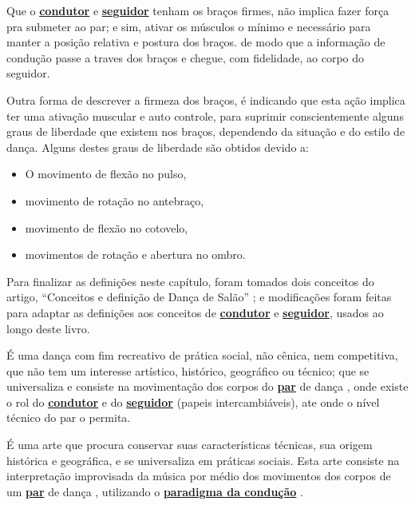 \begin{definition}
\label{def:brazosfirmes} 
Que o \hyperref[def:Condutor]{\textbf{condutor}} e \hyperref[def:Seguidor]{\textbf{seguidor}}
tenham os braços firmes, não implica fazer força pra submeter ao par;
e sim, ativar os músculos o mínimo e necessário para manter a posição relativa e postura dos braços.
de modo que a informação de condução passe a traves dos braços e chegue, com fidelidade, ao corpo do seguidor.

Outra forma de descrever a firmeza dos braços, 
é indicando que esta ação implica ter uma ativação muscular e auto controle, 
para suprimir conscientemente alguns graus de liberdade que existem nos braços, 
dependendo da situação e do estilo de dança.
Alguns destes graus de liberdade são obtidos devido a:
\begin{itemize}
\item O movimento de flexão no pulso,
\item movimento de rotação no antebraço,
\item movimento de flexão no cotovelo,
\item movimentos de rotação e abertura no ombro.
\end{itemize}
\end{definition}



Para finalizar as definições neste capítulo, foram tomados dois conceitos do artigo,
``Conceitos e definição de Dança de Salão'' \cite{Zamoner2012};
e modificações foram feitas para adaptar as definições aos conceitos de \hyperref[def:Condutor]{\textbf{condutor}} e \hyperref[def:Seguidor]{\textbf{seguidor}}, usados ao longo deste livro.

\begin{definition}
\label{def:DancaSocial} 
É uma dança com fim recreativo de prática social, não cênica, nem competitiva, 
que não tem um interesse artístico, histórico, geográfico ou técnico; 
que se universaliza e consiste na movimentação dos corpos do \hyperref[def:Par]{\textbf{par}} de dança  \cite{Zamoner2012}, 
onde existe o rol do \hyperref[def:Condutor]{\textbf{condutor}} 
e do \hyperref[def:Seguidor]{\textbf{seguidor}} (papeis intercambiáveis), 
ate onde o nível técnico do par o permita.
\end{definition}

\begin{definition}
\label{def:DancaSalao}  
É uma arte que procura conservar suas características técnicas, 
sua origem histórica e geográfica, e se universaliza em práticas sociais. 
Esta arte consiste na interpretação improvisada da música por médio dos movimentos 
dos corpos de um \hyperref[def:Par]{\textbf{par}} de dança \cite{Zamoner2012}, 
utilizando o \hyperref[def:ParadigmaConducao]{\textbf{paradigma da condução}} .
\end{definition}

